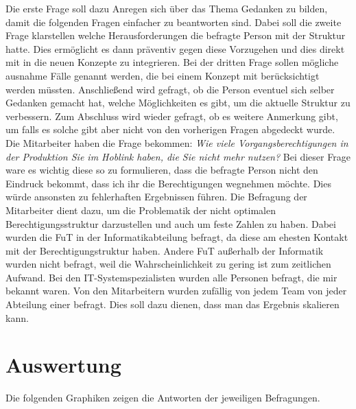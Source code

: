 Die erste Frage soll dazu Anregen sich über das Thema Gedanken zu bilden, damit die folgenden Fragen einfacher zu beantworten sind.
Dabei soll die zweite Frage klarstellen welche Herausforderungen die befragte Person mit der Struktur hatte.
Dies ermöglicht es dann präventiv gegen diese Vorzugehen und dies direkt mit in die neuen Konzepte zu integrieren.
Bei der dritten Frage sollen mögliche ausnahme Fälle genannt werden, die bei einem Konzept mit berücksichtigt werden müssten.
Anschließend wird gefragt, ob die Person eventuel sich selber Gedanken gemacht hat, welche Möglichkeiten es gibt, um die aktuelle Struktur zu verbessern.
Zum Abschluss wird wieder gefragt, ob es weitere Anmerkung gibt, um falls es solche gibt aber nicht von den vorherigen Fragen abgedeckt wurde.
\newline
\newline
Die Mitarbeiter haben die Frage bekommen:
\newline
\newline
\textit{Wie viele Vorgangsberechtigungen in der Produktion Sie im Hoblink haben, die Sie nicht mehr nutzen?}
\newline
\newline
Bei dieser Frage ware es wichtig diese so zu formulieren, dass die befragte Person nicht den Eindruck bekommt, dass ich ihr die Berechtigungen wegnehmen möchte.
Dies würde ansonsten zu fehlerhaften Ergebnissen führen.
Die Befragung der Mitarbeiter dient dazu, um die Problematik der nicht optimalen Berechtigungsstruktur darzustellen und auch um feste Zahlen zu haben.
\newline
\newline
Dabei wurden die \ac{FuT} in der Informatikabteilung befragt, da diese am ehesten Kontakt mit der Berechtigungstruktur haben.
Andere \ac{FuT} außerhalb der Informatik wurden nicht befragt, weil die Wahrscheinlichkeit zu gering ist zum zeitlichen Aufwand.
Bei den IT-Systemspezialisten wurden alle Personen befragt, die mir bekannt waren.
Von den Mitarbeitern wurden zufällig von jedem Team von jeder Abteilung einer befragt.
Dies soll dazu dienen, dass man das Ergebnis skalieren kann.
\newpage
\section{Auswertung}
\label{sec:Auswertung}

Die folgenden Graphiken zeigen die Antworten der jeweiligen Befragungen.

